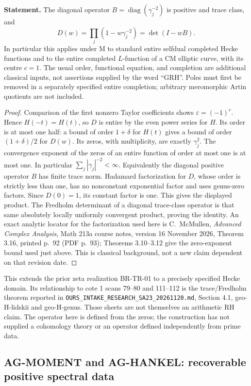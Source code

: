 \textbf{Statement.} The diagonal operator
$B=\operatorname{diag}(\gamma_j^{-2})$ is positive and trace class, and
\[
 D(w)=\prod_j(1-w\gamma_j^{-2})=\det(I-wB).
\]
In particular this applies under M to standard entire selfdual completed
Hecke functions and to the entire completed $L$-function of a CM elliptic
curve, with its centre $c=1$. The usual order, functional equation,
and completion are additional classical inputs, not assertions supplied
by the word ``GRH''. Poles must first be removed in a separately specified
entire completion; arbitrary meromorphic Artin quotients are not included.

\begin{proof}
Comparison of the first nonzero Taylor coefficients shows
$\varepsilon=(-1)^r$. Hence $H(-t)=H(t)$, so $D$ is entire by the even
power series for $H$. Its order is at most one half: a bound of order
$1+\delta$ for $H(t)$ gives a bound of order $(1+\delta)/2$ for $D(w)$.
Its zeros, with multiplicity, are exactly $\gamma_j^2$.
The convergence exponent of the zeros of an entire function of order at
most one is at most one. In particular
$\sum_j|\gamma_j|^{-2}<\infty$. Equivalently the diagonal positive
operator $B$ has finite trace norm. Hadamard factorization for $D$, whose
order is strictly less than one, has no nonconstant exponential factor
and uses genus-zero factors. Since $D(0)=1$, its constant factor is one.
This gives the displayed product. The Fredholm determinant of a diagonal
trace-class operator is that same absolutely locally uniformly convergent
product, proving the identity. An exact analytic locator for the
factorization used here is C.~McMullen, \emph{Advanced Complex Analysis},
Math 213a course notes, version 16 November 2026, Theorem 3.16,
printed p.~92 (PDF p.~93); Theorems 3.10--3.12 give the zero-exponent
bound used just above. This is classical background, not a new claim
dependent on that revision date.
\end{proof}

This extends the prior zeta realization BR-TR-01 to a precisely specified
Hecke domain. Its relationship to cote 1 scans 79--80 and 111--112 is
the trace/Fredholm theorem reported in
\texttt{OURS\_INTAKE\_RESEARCH\_SA23\_20261120.md}, Section 4.1,
geo-H-lidskii and geo-H-genus. Those sheets are not themselves an
arithmetic RH claim. The operator here is defined from the zeros; the
construction has not supplied a cohomology theory or an operator defined
independently from prime data.

\subsection{AG-MOMENT and AG-HANKEL: recoverable positive spectral data}
\label{ag:moment}

